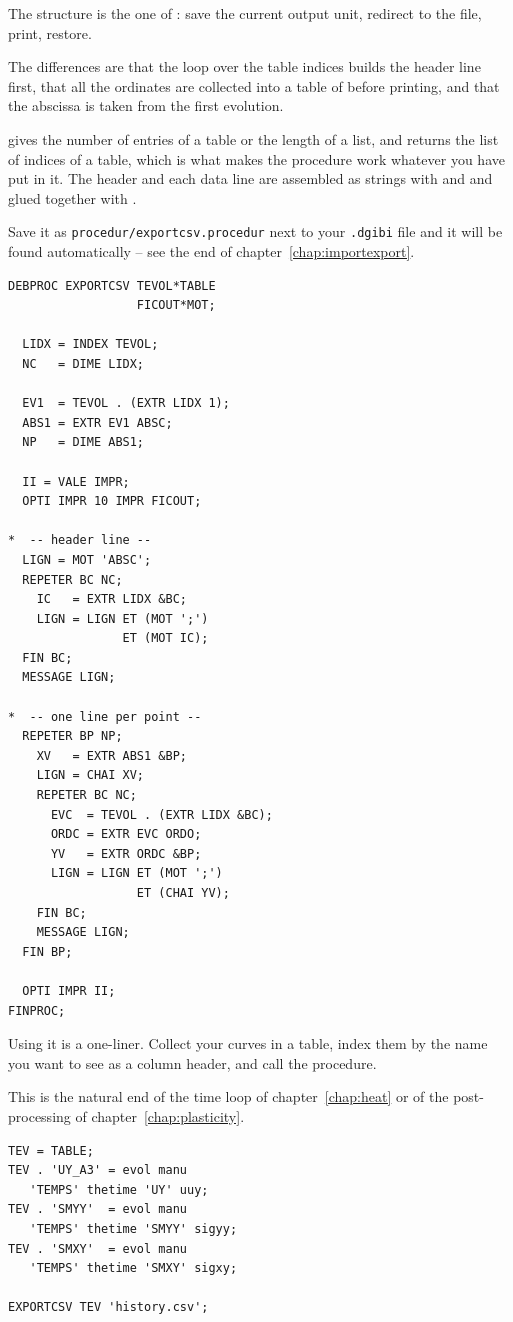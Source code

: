 \begin{castemcom}
The structure is the one of : save the current output unit,
redirect to the file, print, restore.

The differences are that the loop over the table indices builds the header
line first, that all the ordinates are collected into a table of
 before printing, and that the abscissa is taken from the first
evolution.

 gives the number of entries of a table or the length of a list, and
 returns the list of indices of a table, which is what makes the
procedure work whatever you have put in it. The header and each data line are
assembled as strings with  and  and glued together with
.

\medskip
Save it as \texttt{procedur/exportcsv.procedur} next to your
\texttt{.dgibi} file and it will be found automatically -- see the end of
chapter~\ref{chap:importexport}.
\end{castemcom}
\begin{castemlines}
\begin{verbatim}
DEBPROC EXPORTCSV TEVOL*TABLE
                  FICOUT*MOT;

  LIDX = INDEX TEVOL;
  NC   = DIME LIDX;

  EV1  = TEVOL . (EXTR LIDX 1);
  ABS1 = EXTR EV1 ABSC;
  NP   = DIME ABS1;

  II = VALE IMPR;
  OPTI IMPR 10 IMPR FICOUT;

*  -- header line --
  LIGN = MOT 'ABSC';
  REPETER BC NC;
    IC   = EXTR LIDX &BC;
    LIGN = LIGN ET (MOT ';')
                ET (MOT IC);
  FIN BC;
  MESSAGE LIGN;

*  -- one line per point --
  REPETER BP NP;
    XV   = EXTR ABS1 &BP;
    LIGN = CHAI XV;
    REPETER BC NC;
      EVC  = TEVOL . (EXTR LIDX &BC);
      ORDC = EXTR EVC ORDO;
      YV   = EXTR ORDC &BP;
      LIGN = LIGN ET (MOT ';')
                  ET (CHAI YV);
    FIN BC;
    MESSAGE LIGN;
  FIN BP;

  OPTI IMPR II;
FINPROC;
\end{verbatim}
\end{castemlines}

\begin{castemcom}
Using it is a one-liner. Collect your curves in a table, index them by the
name you want to see as a column header, and call the procedure.

This is the natural end of the time loop of chapter~\ref{chap:heat} or of the
 post-processing of chapter~\ref{chap:plasticity}.
\end{castemcom}
\begin{castemlines}
\begin{verbatim}
TEV = TABLE;
TEV . 'UY_A3' = evol manu
   'TEMPS' thetime 'UY' uuy;
TEV . 'SMYY'  = evol manu
   'TEMPS' thetime 'SMYY' sigyy;
TEV . 'SMXY'  = evol manu
   'TEMPS' thetime 'SMXY' sigxy;

EXPORTCSV TEV 'history.csv';
\end{verbatim}
\end{castemlines}

